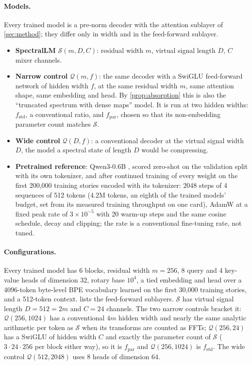 \paragraph{Models.} Every trained model is a pre-norm decoder with the
attention sublayer of \cref{sec:method}; they differ only in width and in the
feed-forward sublayer.
\begin{itemize}
\item \textbf{SpectralLM} $\mathcal{S}(m,D,C)$: residual width $m$, virtual
  signal length $D$, $C$ mixer channels.
\item \textbf{Narrow control} $\mathcal{Q}(m,f)$: the same decoder with a
  SwiGLU feed-forward network of hidden width $f$, at the same residual width
  $m$, same attention shape, same embedding and head. By
  \cref{prop:absorption} this is also the ``truncated spectrum with dense
  maps'' model. It is run at two hidden widths: $f_{\mathrm{std}}$, a
  conventional ratio, and $f_{\mathrm{par}}$, chosen so that its non-embedding
  parameter count matches $\mathcal{S}$.
\item \textbf{Wide control} $\mathcal{Q}(D,f)$: a conventional decoder at the
  virtual signal width $D$, the model a spectral state of length $D$ would be
  compressing.
\item \textbf{Pretrained reference}: Qwen3-0.6B \citep{qwen3report}, scored
  zero-shot on the validation split with its own tokenizer, and after
  continued training of every weight on the first 200{,}000 training stories
  encoded with its tokenizer: 2048 steps of 4 sequences of 512 tokens (4.2M
  tokens, an eighth of the trained models' budget, set from its measured
  training throughput on one card), AdamW at a fixed peak rate of
  $3\times10^{-5}$ with 20 warm-up steps and the same cosine schedule, decay
  and clipping; the rate is a conventional fine-tuning rate, not tuned.
\end{itemize}

\paragraph{Configurations.} Every trained model has 6 blocks, residual width
$m=256$, 8 query and 4 key-value heads of dimension 32, rotary base $10^4$, a
tied embedding and head over a 4096-token byte-level BPE vocabulary learned on
the first 30{,}000 training stories, and a 512-token context.
 lists the feed-forward sublayers. $\mathcal{S}$ has
virtual signal length $D=512=2m$ and $C=24$ channels. The two narrow controls
bracket it: $\mathcal{Q}(256,1024)$ has a conventional $4m$ hidden width and
nearly the same analytic arithmetic per token as $\mathcal{S}$ when its
transforms are counted as FFTs; $\mathcal{Q}(256,24)$ has a SwiGLU of hidden
width $C$ and exactly the parameter count of $\mathcal{S}$ ($3\cdot 24\cdot
256$ per block either way), so it is $f_{\mathrm{par}}$ and
$\mathcal{Q}(256,1024)$ is $f_{\mathrm{std}}$. The wide control
$\mathcal{Q}(512,2048)$ uses 8 heads of dimension 64.

